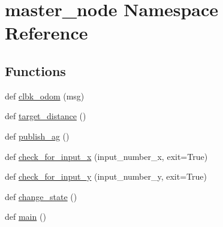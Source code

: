 \hypertarget{namespacemaster__node}{}\section{master\+\_\+node Namespace Reference}
\label{namespacemaster__node}
\subsection*{Functions}
\begin{DoxyCompactItemize}
\item 
def \hyperlink{namespacemaster__node_a5b919927efce47b56b923447a6da9fab}{clbk\+\_\+odom} (msg)
\item 
def \hyperlink{namespacemaster__node_a3488ca68ed6c44dc10a924d5cc2c8bb8}{target\+\_\+distance} ()
\item 
def \hyperlink{namespacemaster__node_a9494767e20dc61a10e137256d2b67fe9}{publish\+\_\+ag} ()
\item 
def \hyperlink{namespacemaster__node_aa380f26d72ff2ce61ff24f6f902f77cb}{check\+\_\+for\+\_\+input\+\_\+x} (input\+\_\+number\+\_\+x, exit=True)
\item 
def \hyperlink{namespacemaster__node_a5ae7433fe2f806e9c004f79b3417de18}{check\+\_\+for\+\_\+input\+\_\+y} (input\+\_\+number\+\_\+y, exit=True)
\item 
def \hyperlink{namespacemaster__node_a5bfa19ba31fffb842b2a34586ca8afff}{change\+\_\+state} ()
\item 
def \hyperlink{namespacemaster__node_a2ca55226f7fa9d0a646050f441478702}{main} ()
\end{DoxyCompactItemize}
